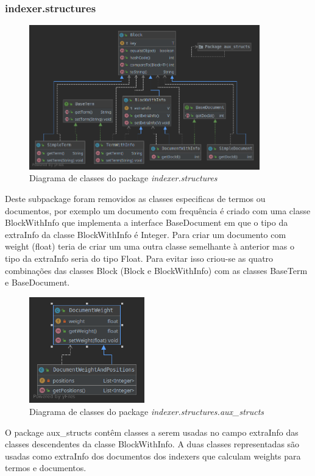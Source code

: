 \documentclass[12pt]{article}
\begin{document}
\subsubsection{indexer.structures}
\begin{figure}[H]
  \center
  \includegraphics[width=10cm]{packages_indexer_structures.png}
  \caption{Diagrama de classes do package \it indexer.structures}
\end{figure}

Deste subpackage foram removidos as classes especificas de termos ou
documentos, por exemplo um documento com frequência é criado com uma
classe BlockWithInfo que implementa a interface BaseDocument em que o
tipo da extraInfo da classe BlockWithInfo é Integer. Para criar um
documento com weight (float) teria de criar um uma outra classe
semelhante à anterior mas o tipo da extraInfo seria do tipo Float.
Para evitar isso criou-se as quatro combinações das classes Block
(Block e BlockWithInfo) com as classes BaseTerm e BaseDocument.

\begin{figure}[h]
  \center
  \includegraphics[width=5cm]{packages_indexer_structures_auxstructs.png}
  \caption{Diagrama de classes do package \it indexer.structures.aux\_structs}
\end{figure}

O package aux\_structs contêm classes a serem usadas no campo
extraInfo das classes descendentes da classe BlockWithInfo. A
duas classes representadas são usadas como extraInfo dos documentos
dos indexers que calculam weights para termos e documentos.
\end{document}
